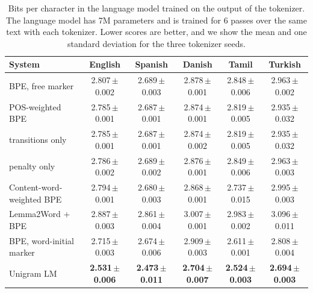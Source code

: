 \begin{table}[!ht]
\centering
\caption{Bits per character in the language model trained on the output of the tokenizer. The language model has 7M parameters and is trained for 6 passes over the same text with each tokenizer. Lower scores are better, and we show the mean and one standard deviation for the three tokenizer seeds.}
\label{tab:bpc}
\small
\setlength{\tabcolsep}{4pt}
\begin{tabular}{lccccc}
\toprule
System & English & Spanish & Danish & Tamil & Turkish \\
\midrule
BPE, free marker & 2.807\,{\scriptsize$\pm$0.002} & 2.689\,{\scriptsize$\pm$0.003} & 2.878\,{\scriptsize$\pm$0.001} & 2.848\,{\scriptsize$\pm$0.006} & 2.963\,{\scriptsize$\pm$0.002} \\
POS-weighted BPE & 2.785\,{\scriptsize$\pm$0.001} & 2.687\,{\scriptsize$\pm$0.001} & 2.874\,{\scriptsize$\pm$0.001} & 2.819\,{\scriptsize$\pm$0.005} & 2.935\,{\scriptsize$\pm$0.032} \\
\quad transitions only & 2.785\,{\scriptsize$\pm$0.001} & 2.687\,{\scriptsize$\pm$0.001} & 2.874\,{\scriptsize$\pm$0.002} & 2.819\,{\scriptsize$\pm$0.005} & 2.935\,{\scriptsize$\pm$0.032} \\
\quad penalty only & 2.786\,{\scriptsize$\pm$0.002} & 2.689\,{\scriptsize$\pm$0.002} & 2.876\,{\scriptsize$\pm$0.001} & 2.849\,{\scriptsize$\pm$0.006} & 2.963\,{\scriptsize$\pm$0.003} \\
\addlinespace[2pt]
Content-word-weighted BPE & 2.794\,{\scriptsize$\pm$0.001} & 2.680\,{\scriptsize$\pm$0.003} & 2.868\,{\scriptsize$\pm$0.001} & 2.737\,{\scriptsize$\pm$0.015} & 2.995\,{\scriptsize$\pm$0.003} \\
Lemma2Word + BPE & 2.887\,{\scriptsize$\pm$0.003} & 2.861\,{\scriptsize$\pm$0.004} & 3.007\,{\scriptsize$\pm$0.001} & 2.983\,{\scriptsize$\pm$0.002} & 3.096\,{\scriptsize$\pm$0.011} \\
BPE, word-initial marker & 2.715\,{\scriptsize$\pm$0.003} & 2.674\,{\scriptsize$\pm$0.006} & 2.909\,{\scriptsize$\pm$0.003} & 2.611\,{\scriptsize$\pm$0.001} & 2.808\,{\scriptsize$\pm$0.004} \\
Unigram LM & \textbf{2.531\,{\scriptsize$\pm$0.006}} & \textbf{2.473\,{\scriptsize$\pm$0.011}} & \textbf{2.704\,{\scriptsize$\pm$0.007}} & \textbf{2.524\,{\scriptsize$\pm$0.003}} & \textbf{2.694\,{\scriptsize$\pm$0.003}} \\
\bottomrule
\end{tabular}
\end{table}
